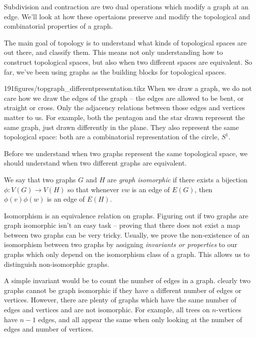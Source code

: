 \begin{elevator}
Subdivision and contraction are two dual operations which  modify a graph at an edge.
We'll look at how these opertaions preserve and modify the topological and combinatorial properties of a graph.
\end{elevator}
\label{sec:graph:Minors}
The main goal of topology is to understand what kinds of topological spaces are out there, and classify them.
This means not only understanding how to construct topological spaces, but also when two different spaces are equivalent.
So far, we've been using graphs as the building blocks for topological spaces.
\begin{examplefigureenv}{191figures/topgraph_differentpresentation.tikz}
	When we draw a graph,  we do not care how we draw the edges of the graph --  the edges are allowed to be bent, or straight or cross. Only the adjacency relations between those edges and vertices matter to us.
	For example, both the pentagon and the star drawn represent the same graph, just drawn differently in the plane.
	They also represent the same topological space: both are a combinatorial representation of the circle, $S^1$.
	\end{examplefigureenv}
Before we understand when two graphs represent the same topological space, we should understand when two different graphs are equivalent.
\begin{definition}
	We say that two graphs $G$ and $H$ are \emph{graph isomorphic} if there exists a bijection $\phi: V(G)\to V(H)$ so that whenever $vw$ is an edge of $E(G)$, then $\phi(v)\phi(w)$ is an edge of $E(H)$. 
	\label{def:graphiso}
\end{definition}

Isomorphism is an equivalence relation on graphs. 
Figuring out if two graphs are graph isomorphic isn't an easy task -- proving that there does not exist a map between two graphs can be very tricky. 
Usually, we prove the non-existence of an isomorphism between two graphs by assigning \emph{invariants or properties} to our graphs which only depend on the isomorphism class of a graph. 
This allows us to distinguish non-isomorphic graphs. 

A simple invariant would be to count the number of edges in a graph.  clearly two graphs cannot be graph isomorphic if they have a different number of edges or vertices.
However, there are plenty of graphs which have the same number of edges and vertices and are not isomorphic. 
For example, all trees on $n$-vertices  have $n-1$ edges, and all appear the same when only looking at the number of edges and number of vertices. 

